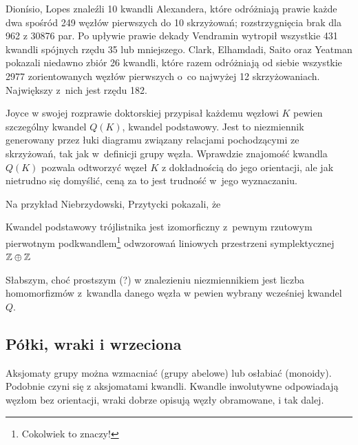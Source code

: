 Dionísio, Lopes \cite{lopes2003} znaleźli 10 kwandli Alexandera, które odróżniają prawie każde dwa spośród 249 węzłów pierwszych do 10 skrzyżowań; rozstrzygnięcia brak dla 962 z 30876 par.
%
%
Po upływie prawie dekady Vendramin \cite{vendramin2012} wytropił wszystkie 431 kwandli spójnych rzędu 35 lub mniejszego.
%
Clark, Elhamdadi, Saito oraz Yeatman \cite{clark2013} pokazali niedawno zbiór 26 kwandli, które razem odróżniają od siebie wszystkie 2977 zorientowanych węzłów pierwszych o~co najwyżej 12 skrzyżowaniach.
%
%
%
%
Największy z~nich jest rzędu 182.

Joyce w swojej rozprawie doktorskiej przypisał każdemu węzłowi $K$ pewien szczególny kwandel $Q(K)$, kwandel podstawowy.
%
%
Jest to niezmiennik generowany przez łuki diagramu związany relacjami pochodzącymi ze skrzyżowań, tak jak w~definicji grupy węzła.
Wprawdzie znajomość kwandla $Q(K)$ pozwala odtworzyć węzeł $K$ z dokładnością do jego orientacji, ale jak nietrudno się domyślić, ceną za to jest trudność w~jego wyznaczaniu.

Na przykład Niebrzydowski, Przytycki \cite{niebrzydowski2009} pokazali, że
%
%

\begin{example}
    Kwandel podstawowy trójlistnika  jest izomorficzny z~pewnym rzutowym pierwotnym podkwandlem\footnote{Cokolwiek to znaczy!} odwzorowań liniowych przestrzeni symplektycznej $\mathbb Z \oplus \mathbb Z$
\end{example}

Słabszym, choć prostszym (?) w znalezieniu niezmiennikiem jest liczba homomorfizmów z~kwandla danego węzła w pewien wybrany wcześniej kwandel $Q$.

\subsection{Półki, wraki i wrzeciona}
Aksjomaty grupy można wzmacniać (grupy abelowe) lub osłabiać (monoidy).
Podobnie czyni się z aksjomatami kwandli.
Kwandle inwolutywne odpowiadają węzłom bez orientacji, wraki dobrze opisują węzły obramowane, i tak dalej.
%
%

